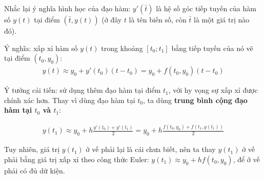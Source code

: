 \documentclass[12pt]{article}
\begin{document}
Nhắc lại ý nghĩa hình học của đạo hàm: $y'(\bar{t})$ là hệ số góc tiếp tuyến của hàm số $y(t)$ tại điểm $(\bar{t},y(t))$ (ở đây $t$ là tên biến số, còn $\bar{t}$ là một giá trị nào đó).


Ý nghĩa: xấp xỉ hàm số $y(t)$ trong khoảng $[t_0;t_1]$ bằng tiếp tuyến của nó vẽ tại điểm $(t_0,y_0)$:
\begin{align}
 y(t) \approx y_0 + y'(t_0) (t - t_0) = y_0 + f(t_0,y_0)(t-t_0)
\end{align}


\newpage{}

Ý tưởng cải tiến: sử dụng thêm đạo hàm tại điểm $t_1$, với hy vọng sự xấp xỉ được chính xác hơn. Thay vì dùng đạo hàm tại $t_0$, ta dùng \textbf{trung bình cộng đạo hàm tại $t_0$ và $t_1$}:


\begin{align}
 y(t_1) \approx y_0 + h\frac{y'(t_0)+y'(t_1)}{2} = y_0 + h\frac{f(t_0,y_0)+f(t_1,y(t_1))}{2}
\end{align}

Tuy nhiên, giá trị $y(t_1)$ ở vế phải lại là cái chưa biết, nên ta thay $y(t_1)$ ở vế phải bằng giá trị xấp xỉ theo công thức Euler: $y(t_1) \approx y_0 + hf(t_0,y_0)$, để ở vế phải có đủ dữ kiện.


\newpage{}

\end{document}
